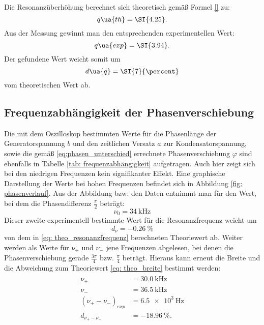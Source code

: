 Die Resonanzüberhöhung berechnet sich theoretisch gemäß Formel \eqref{} zu:
\begin{equation}
  q\ua{th} = \SI{4.25}.
\end{equation}
Aus der Messung gewinnt man den entsprechenden experimentellen Wert:
\begin{equation}
    q\ua{exp} = \SI{3.94}.
\end{equation}
Der gefundene Wert weicht somit um
\begin{equation}
  d\ua{q} = \SI{7}{\percent}
\end{equation}
vom theoretischen Wert ab.

\subsection{Frequenzabhängigkeit der Phasenverschiebung}
Die mit dem Oszilloskop bestimmten Werte für die Phasenlänge der Generatorspannung $b$ und den zeitlichen Versatz $a$ zur Kondensatorspannung, sowie die gemäß \eqref{eq:phasen_unterschied}
errechnete Phasenverschiebung $\varphi$ sind ebenfalls in Tabelle \ref{tab: frequenzabhängigkeit} aufgetragen. Auch hier zeigt sich bei den niedrigen
Frequenzen kein signifikanter Effekt. Eine graphische Darstellung der Werte bei hohen Frequenzen befindet sich in
Abbildung \ref{fig: phasenverlauf}. Aus der Abbildung bzw. den Daten entnimmt man für den Wert, bei dem die Phasendifferenz $\frac{\pi}{2}$ beträgt:
\begin{equation}
  \nu_0 = \SI{34}{\kilo\hertz}
\end{equation}
Dieser zweite experimentell bestimmte Wert für die Resonanzfrequenz weicht um
\begin{equation}
  d_{\nu} = \SI{-0.26}{\percent}
\end{equation}
von dem in \eqref{eq: theo_resonanzfrequenz} berechneten Theoriewert ab.
Weiter werden als Werte für $\nu_+$ und $\nu_-$ jene Frequenzen abgelesen, bei denen die Phasenverschiebung
gerade $\frac{3\pi}{4}$ bzw. $\frac{\pi}{4}$ beträgt. Hieraus kann erneut die Breite und die Abweichung
zum Theoriewert \eqref{eq: theo_breite} bestimmt werden:
\begin{align}
  \begin{aligned}
  \nu_{+} &= \SI{30.0}{\kilo\hertz} \\
  \nu_{-} &= \SI{36.5}{\kilo\hertz} \\
  (\nu_{+}-\nu_{-})_{exp} &= \SI{6.5e3}{\hertz} \\
  d_{\nu_{+}-\nu_{-}} &= \SI{-18.96}{\percent}.
\end{aligned}
\end{align}


